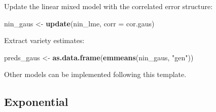 \documentclass[
]{book}
\newenvironment{Shaded}{\begin{snugshade}}{\end{snugshade}}
\newcommand{\AttributeTok}[1]{\textcolor[rgb]{0.13,0.29,0.53}{#1}}
\newcommand{\FunctionTok}[1]{\textcolor[rgb]{0.13,0.29,0.53}{\textbf{#1}}}
\newcommand{\NormalTok}[1]{#1}
\newcommand{\OtherTok}[1]{\textcolor[rgb]{0.56,0.35,0.01}{#1}}
\newcommand{\StringTok}[1]{\textcolor[rgb]{0.31,0.60,0.02}{#1}}
\begin{document}
Update the linear mixed model with the correlated error structure:

\begin{Shaded}
\begin{Highlighting}[]
\NormalTok{nin\_gaus }\OtherTok{\textless{}{-}} \FunctionTok{update}\NormalTok{(nin\_lme, }\AttributeTok{corr =}\NormalTok{ cor.gaus)}
\end{Highlighting}
\end{Shaded}

Extract variety estimates:

\begin{Shaded}
\begin{Highlighting}[]
\NormalTok{preds\_gaus }\OtherTok{\textless{}{-}} \FunctionTok{as.data.frame}\NormalTok{(}\FunctionTok{emmeans}\NormalTok{(nin\_gaus, }\StringTok{"gen"}\NormalTok{))}
\end{Highlighting}
\end{Shaded}

Other models can be implemented following this template.

\hypertarget{exponential-1}{%
\subsection{Exponential}\label{exponential-1}}
\end{document}
